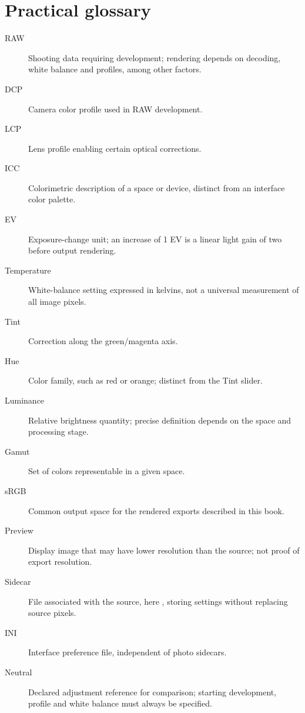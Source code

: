 \chapter{Practical glossary}
\begin{description}
\item[RAW] Shooting data requiring development; rendering depends on decoding,
white balance and profiles, among other factors.
\item[DCP] Camera color profile used in RAW development.
\item[LCP] Lens profile enabling certain optical corrections.
\item[ICC] Colorimetric description of a space or device, distinct from an
interface color palette.
\item[EV] Exposure-change unit; an increase of 1 EV is a linear light gain of
two before output rendering.
\item[Temperature] White-balance setting expressed in kelvins, not a universal
measurement of all image pixels.
\item[Tint] Correction along the green/magenta axis.
\item[Hue] Color family, such as red or orange; distinct from the Tint slider.
\item[Luminance] Relative brightness quantity; precise definition depends on
the space and processing stage.
\item[Gamut] Set of colors representable in a given space.
\item[sRGB] Common output space for the rendered exports described in this book.
\item[Preview] Display image that may have lower resolution than the source;
not proof of export resolution.
\item[Sidecar] File associated with the source, here , storing
settings without replacing source pixels.
\item[INI] Interface preference file, independent of photo sidecars.
\item[Neutral] Declared adjustment reference for comparison; starting development,
profile and white balance must always be specified.
\end{description}

